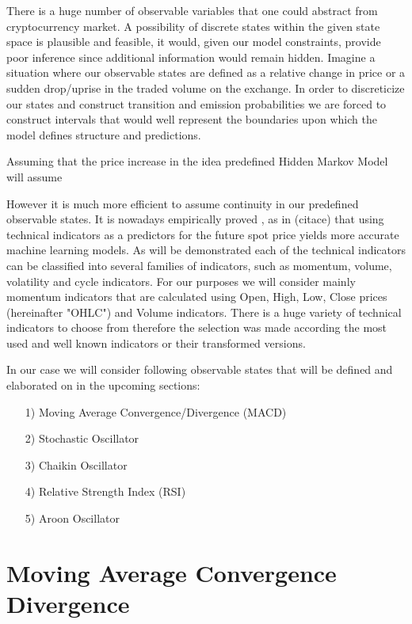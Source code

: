 	There is a huge number of observable variables that one could abstract from cryptocurrency market. A possibility of discrete states within the given state space is plausible and feasible, it would, given our model constraints, provide poor inference since additional information would remain hidden. Imagine a situation where our observable states are defined as a relative change in price or a sudden drop/uprise in the traded volume on the exchange. In order to discreticize our states and construct transition and emission probabilities we are forced to construct intervals that would well represent the boundaries upon which the model defines structure and predictions. 
	
Assuming that the price increase in   the idea predefined Hidden Markov Model will assume
	
	However it is much more efficient to assume continuity in our predefined observable states. It is nowadays empirically proved , as in (citace) that using technical indicators as a predictors for the future spot price yields more accurate machine learning models. As will be demonstrated each of the technical indicators can be classified into several families of indicators, such as momentum, volume, volatility and cycle indicators. For our purposes we will consider mainly momentum indicators that are calculated using Open, High, Low, Close prices (hereinafter "OHLC") and Volume indicators. There is a huge variety of technical indicators to choose from therefore the selection was made according the most used and well known indicators or their transformed versions. 

In our case we will consider following observable states that will be defined and elaborated on in the upcoming sections:

\begin{itemize}
\item[1)] Moving Average Convergence/Divergence (MACD)
\item[2)] Stochastic Oscillator
\item[3)] Chaikin Oscillator 
\item[4)] Relative Strength Index (RSI)
\item[5)] Aroon Oscillator 
\end{itemize}


\section{Moving Average Convergence Divergence}

